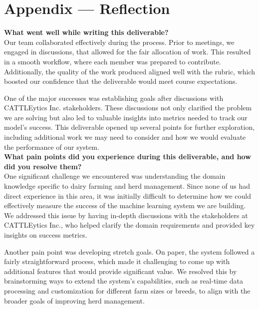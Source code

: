 \documentclass{article}
\begin{document}
\newpage{}

\section*{Appendix --- Reflection}


\textbf{What went well while writing this deliverable?} \\
Our team collaborated effectively during the process. Prior to meetings, we 
engaged in discussions, that allowed for the fair allocation of work. This
resulted in a smooth workflow, where each member was prepared to contribute. 
Additionally, the quality of the work produced aligned well with the rubric, 
which boosted our confidence that the deliverable would meet course 
expectations.

One of the major successes was establishing goals after discussions with 
CATTLEytics Inc. stakeholders. These discussions not only clarified the problem 
we are solving but also led to valuable insights into metrics needed to track 
our model's success. This deliverable opened up several points for further 
exploration, including additional work we may need to consider and 
how we would evaluate the performance of our system. \\


\textbf{What pain points did you experience during this deliverable, and how
did you resolve them?} \\
One significant challenge we encountered was understanding the domain knowledge 
specific to dairy farming and herd management. Since none of us had direct 
experience in this area, it was initially difficult to determine how we could 
effectively measure the success of the machine learning system we are building. 
We addressed this issue by having in-depth discussions with the stakeholders at 
CATTLEytics Inc., who helped clarify the domain requirements and provided key 
insights on success metrics.

Another pain point was developing stretch goals. On paper, the system followed 
a fairly straightforward process, which made it challenging to come up with 
additional features that would provide significant value. We resolved this by 
brainstorming ways to extend the system's capabilities, such as real-time data 
processing and customization for different farm sizes or breeds, to align with 
the broader goals of improving herd management. \\
\end{document}
